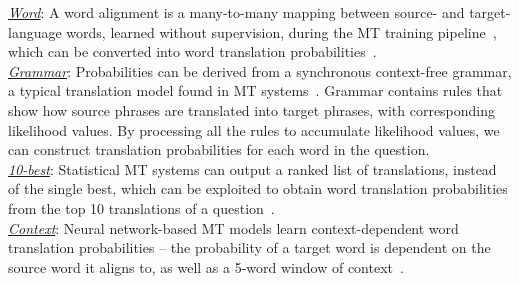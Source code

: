 \documentclass{sig-alternate-05-2015}
\begin{document}
\noindent \underline{\emph{Word}}: A word alignment is a many-to-many mapping between source- and target-language words,
learned without supervision, during the MT training pipeline~\cite{Och:2003a}, which 
can be converted into word translation probabilities~\cite{Darwish:2003aa}.\\
\underline{\emph{Grammar}}: Probabilities can be derived from a synchronous context-free grammar, a typical
translation model found in MT systems~\cite{Ture:2014aa}. Grammar contains rules that show how source phrases
are translated into target phrases, with corresponding likelihood values.
By processing all the rules to accumulate likelihood values, we can construct translation probabilities for each word in the question.\\
\underline{\emph{10-best}}: Statistical MT systems can output a ranked list of translations, instead of the single best, which 
can be exploited to obtain word translation probabilities from the top 10 translations of a question~\cite{Ture:2014aa}.\\
\underline{\emph{Context}}: Neural network-based MT models learn context-dependent word translation probabilities -- 
the probability of a target word is dependent on the source word it aligns to, as well as a 5-word window of context~\cite{Devlin:2014}.\\
\end{document}
